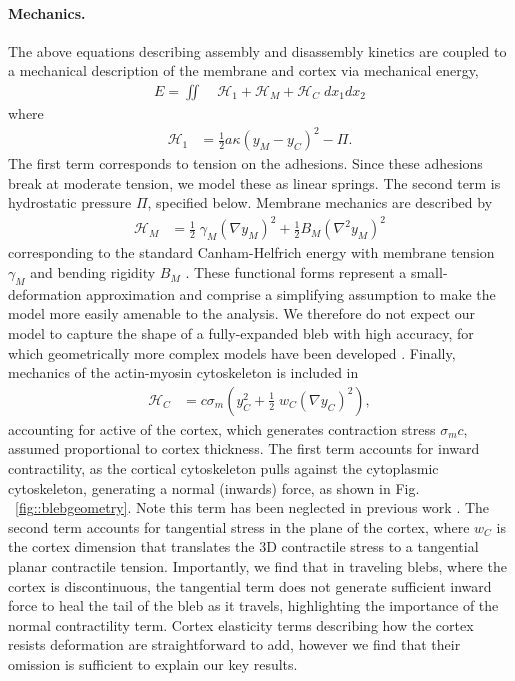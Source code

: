 \paragraph{Mechanics.}
The above equations describing assembly and disassembly kinetics are coupled to a mechanical description of the membrane and cortex via mechanical energy,
\begin{align}
E = \iint&\;   \mathcal{H}_1 + \mathcal{H}_M + \mathcal{H}_C \; dx_1 dx_2 \label{eq::energy}
\end{align}
where 
\begin{align}
\mathcal{H}_1 &= \frac{1}{2}a\kappa \left(y_M-y_C\right)^2 - \Pi.
\end{align}
The first term corresponds to tension on the adhesions. Since these adhesions break at moderate tension, we model these as linear springs. The second term is hydrostatic pressure $\Pi$, specified below. Membrane mechanics are described by
\begin{align}
\mathcal{H}_M &= \frac{1}{2}\; \gamma_M \left( \nabla y_M \right)^2 + \frac{1}{2}B_M \left( \nabla^2 y_M \right)^2 
\end{align}
corresponding to the standard Canham-Helfrich energy with membrane tension $\gamma_M$ and bending rigidity $B_M$ \cite{Helfrich:1973td,Alert:2015gz,Woolley:2014jm,Lim:2012fz}. These functional forms represent a small-deformation approximation and comprise a simplifying assumption to make the model more easily amenable to the analysis. We therefore do not expect our model to capture the shape of a fully-expanded bleb with high accuracy, for which geometrically more complex models have been developed \cite{Woolley:2015jn}. Finally, mechanics of the actin-myosin cytoskeleton is included in
\begin{align}
\mathcal{H}_C &= c\sigma_m \left( y_C^2 + \frac{1}{2}\; w_C \left( \nabla y_C \right)^2 \right), 
\end{align}
accounting for active of the cortex, which generates contraction stress $\sigma_m c$, assumed proportional to cortex thickness. The first term accounts for inward contractility, as the cortical cytoskeleton pulls against the cytoplasmic cytoskeleton, generating a normal (inwards) force, {as shown in  Fig. ~\ref{fig::blebgeometry}}. Note this term has been neglected in previous work \cite{Lim:2012fz}. The second term accounts for tangential stress in the plane of the cortex, where $w_C$ is the cortex dimension that translates the 3D contractile stress to a tangential planar contractile tension. Importantly, we find that in traveling blebs, where the cortex is discontinuous, the tangential term does not generate sufficient inward force to heal the tail of the bleb as it travels, highlighting the importance of the normal contractility term. Cortex elasticity terms describing how the cortex resists deformation are straightforward to add, however we find that their omission is sufficient to explain our key results. 

